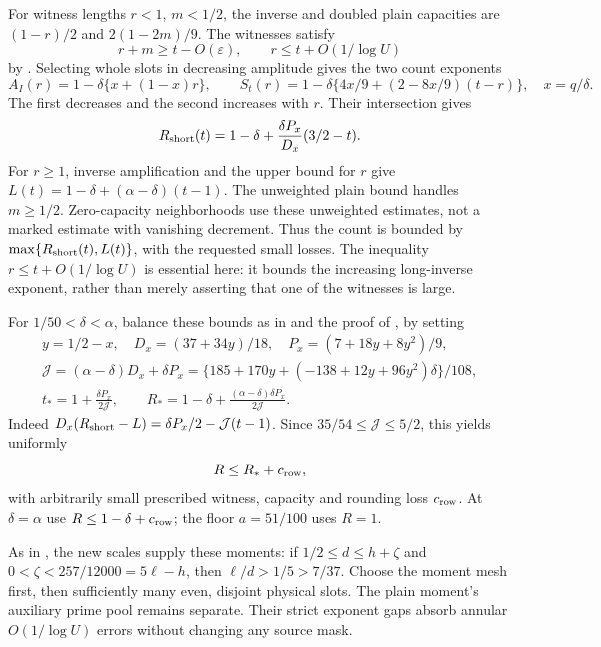For witness lengths \(r<1\), \(m<1/2\), the inverse and doubled
plain capacities are \((1-r)/2\) and \(2(1-2m)/9\).
The witnesses satisfy
\[
 r+m\ge t-O(\varepsilon),\qquad
 r\le t+O(1/\log U)
\]
by \cite[Proposition 8.3]{OAI26}. Selecting whole slots in decreasing
amplitude gives the two count exponents
\[
 A_I(r)=1-\delta\{x+(1-x)r\},\qquad
 S_t(r)=1-\delta\{4x/9+(2-8x/9)(t-r)\},\quad x=q/\delta .
\]
The first decreases and the second increases with \(r\).
Their intersection gives
\[
 R_{\rm short}(t)=1-\delta+
       \frac{\delta P_x}{D_x}(3/2-t).
\]
For \(r\ge1\), inverse amplification and the upper bound for \(r\)
give \(L(t)=1-\delta+(\alpha-\delta)(t-1)\).
The unweighted plain bound handles \(m\ge1/2\).
Zero-capacity neighborhoods use these unweighted estimates,
not a marked estimate with vanishing decrement.
Thus the count is bounded by
\(\max\{R_{\rm short}(t),L(t)\}\), with the requested small losses.
The inequality \(r\le t+O(1/\log U)\) is essential here:
it bounds the increasing long-inverse exponent, rather than merely
asserting that one of the witnesses is large.

For \(1/50<\delta<\alpha\), balance these bounds as in
\cite[(20.8)]{OAI26} and the proof of \cite[Lemma 20.2]{OAI26}, by
setting
\begin{equation}\label{gex:balanced-count}
\begin{gathered}
 y=1/2-x,\quad D_x=(37+34y)/18,\quad P_x=(7+18y+8y^2)/9,\\
 \mathcal J=(\alpha-\delta)D_x+\delta P_x
 =\{185+170y+(-138+12y+96y^2)\delta\}/108,\\
 t_*=1+\frac{\delta P_x}{2\mathcal J},\qquad
 R_*=1-\delta+\frac{(\alpha-\delta)\delta P_x}{2\mathcal J}.
\end{gathered}
\end{equation}
Indeed \(D_x(R_{\rm short}-L)=
\delta P_x/2-\mathcal J(t-1)\).
Since \(35/54\le\mathcal J\le5/2\), this yields uniformly
\begin{equation}\label{gex:row-count-with-loss}
 R\le R_*+c_{\rm row},
\end{equation}
with arbitrarily small prescribed witness, capacity and rounding
loss \(c_{\rm row}\). At \(\delta=\alpha\) use
\(R\le1-\delta+c_{\rm row}\); the floor \(a=51/100\) uses \(R=1\).

As in \cite[Section 20.5]{OAI26}, the new scales supply these
moments: if
\(1/2\le d\le h+\zeta\) and \(0<\zeta<257/12000=5\ell-h\),
then \(\ell/d>1/5>7/37\).
Choose the moment mesh first, then sufficiently many even, disjoint
physical slots. The plain moment's auxiliary prime pool remains
separate. Their strict exponent gaps absorb annular
\(O(1/\log U)\) errors without changing any source mask.

